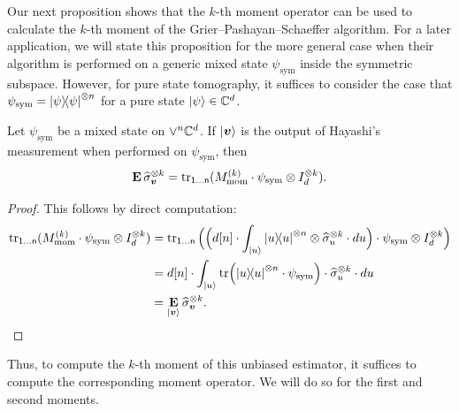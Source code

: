 \documentclass{article}
\newcommand{\reg}[1]{\mathsf{#1}}
\begin{document}
Our next proposition shows that the $k$-th moment operator can be used to calculate the $k$-th moment of the Grier--Pashayan--Schaeffer algorithm.
For a later application, we will state this proposition for the more general case when their algorithm is performed on a generic mixed state $\psi_{\mathrm{sym}}$ inside the symmetric subspace.
However, for pure state tomography, it suffices to consider the case that $\psi_{\mathrm{sym}} = \ketbra{\psi}^{\otimes n}$ for a pure state $\ket{\psi} \in \mathbb C^d$.
\begin{proposition}\label{prop:moment}
    Let $\psi_{\mathrm{sym}}$ be a mixed state on $\lor^n \mathbb C^d$.
    If $\ket{\boldsymbol{v}}$ is the output of Hayashi's measurement when performed on $\psi_{\mathrm{sym}}$, then
    \begin{equation*}
        \E \widehat{\sigma}_{\bv}^{\otimes k} = \tr_{\reg{1}\dots\reg{n}}(M_{\mathrm{mom}}^{(k)} \cdot \psi_{\mathrm{sym}} \otimes I_d^{\otimes k}).
    \end{equation*}
\end{proposition}
\begin{proof}
    This follows by direct computation:
    \begin{align*}
        \tr_{\reg{1}\dots\reg{n}}(M_{\mathrm{mom}}^{(k)} \cdot \psi_{\mathrm{sym}} \otimes I_d^{\otimes k})
        & = \tr_{\reg{1}\dots\reg{n}}\Big(\Big(d[n] \cdot \int_{\ket{u}} \ketbra{u}^{\otimes n} \otimes \widehat{\sigma}_{u}^{\otimes k} \cdot du\Big) \cdot \psi_{\mathrm{sym}} \otimes I_d^{\otimes k}\Big)\\
        &= d[n] \cdot \int_{\ket{u}} \tr(\ketbra{u}^{\otimes n} \cdot \psi_{\mathrm{sym}}) \cdot \widehat{\sigma}_{u}^{\otimes k} \cdot du\\
        &= \E_{\ket{\bv}} \widehat{\sigma}_{\bv}^{\otimes k}.\qedhere
    \end{align*}
\end{proof}

Thus, to compute the $k$-th moment of this unbiased estimator, it suffices to compute the corresponding moment operator.
We will do so for the first and second moments.
\end{document}
